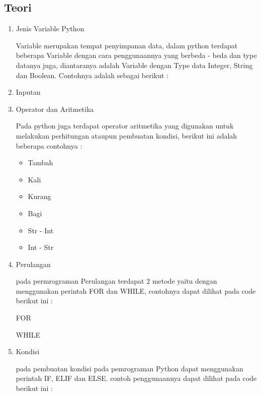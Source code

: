 \subsection{Teori}
\begin{enumerate}
\item Jenis Variable Python
\par Variable merupakan tempat penyimpanan data, dalam python terdapat beberapa Variable dengan cara penggunaannya yang berbeda - beda dan  type datanya juga, diantaranya adalah Variable dengan Type data Integer, String dan Boolean. Contohnya adalah sebagai berikut :


\item Inputan


\item Operator dan Aritmetika
\par Pada python juga terdapat operator aritmetika yang digunakan untuk melakukan perhitungan ataupun pembuatan kondisi, berikut ini adalah beberapa contohnya :
\begin{itemize}
	\item Tambah
	
	\item Kali
	
	\item Kurang
	
	\item Bagi
	
	\item Str - Int
	
	\item Int - Str
	
\end{itemize}

\item Perulangan
\par pada permrograman Perulangan terdapat 2 metode yaitu dengan menggunakan perintah FOR dan WHILE, contohnya dapat dilihat pada code berikut ini :
\par FOR

\par WHILE


\item Kondisi
\par pada pembuatan kondisi pada pemrograman Python dapat menggunakan perintah IF,  ELIF dan ELSE. contoh penggunaannya dapat dilihat pada code berikut ini :



\end{enumerate}
